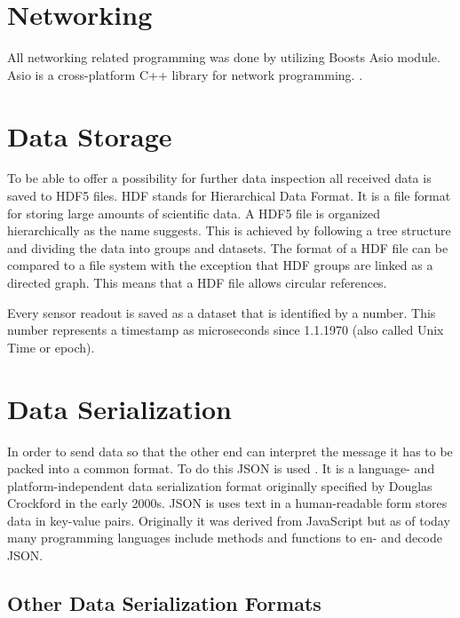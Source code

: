 \section{Networking}

All networking related programming was done by utilizing Boosts Asio module. Asio is a cross-platform C++ library for network programming. \cite{BoostAsio}.

\section{Data Storage}

To be able to offer a possibility for further data inspection all received data is saved to HDF5 files. HDF stands for Hierarchical Data Format. It is a file format for storing large amounts of scientific data. A HDF5 file is organized hierarchically as the name suggests. This is achieved by following a tree structure and dividing the data into groups and datasets. The format of a HDF file can be compared to a file system with the exception that HDF groups are linked as a directed graph. This means that a HDF file allows circular references.

Every sensor readout is saved as a dataset that is identified by a number. This number represents a timestamp as microseconds since 1.1.1970 (also called Unix Time or epoch).

\section{Data Serialization}

%
%


In order to send data so that the other end can interpret the message it has to be packed into a common format. To do this JSON is used \cite{rfc8259}. It is a language- and platform-independent data serialization format
originally specified by Douglas Crockford in the early 2000s. JSON is uses text in a human-readable form stores data in key-value pairs. Originally it was derived from JavaScript but as of today many programming languages
include methods and functions to en- and decode JSON.

\subsection{Other Data Serialization Formats}

